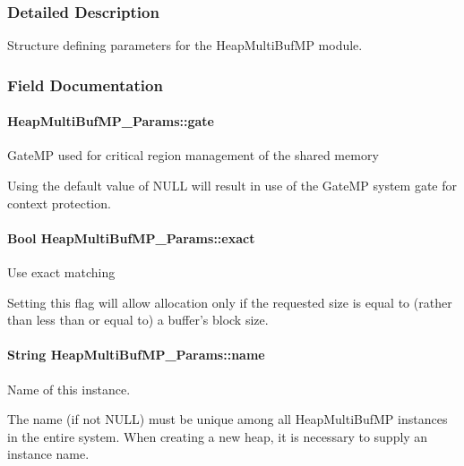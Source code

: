 \subsubsection{Detailed Description}
Structure defining parameters for the HeapMultiBufMP module. 

\subsubsection{Field Documentation}
\paragraph[{gate}]{ {\bf HeapMultiBufMP\_\-Params::gate}}\hfill\label{struct_heap_multi_buf_m_p___params_a3c5f4bb4ecfb525299208a686c27cbfd}
GateMP used for critical region management of the shared memory

Using the default value of NULL will result in use of the GateMP system gate for context protection. 
\paragraph[{exact}]{\setlength{\rightskip}{0pt plus 5cm}Bool {\bf HeapMultiBufMP\_\-Params::exact}}\hfill\label{struct_heap_multi_buf_m_p___params_a3ed83d3de19f3fd04062229fe6c693f7}
Use exact matching

Setting this flag will allow allocation only if the requested size is equal to (rather than less than or equal to) a buffer's block size. 
\paragraph[{name}]{\setlength{\rightskip}{0pt plus 5cm}String {\bf HeapMultiBufMP\_\-Params::name}}\hfill\label{struct_heap_multi_buf_m_p___params_ac7a5994ab0dd02e88d3ad16e23b1a548}
Name of this instance.

The name (if not NULL) must be unique among all HeapMultiBufMP instances in the entire system. When creating a new heap, it is necessary to supply an instance name.

